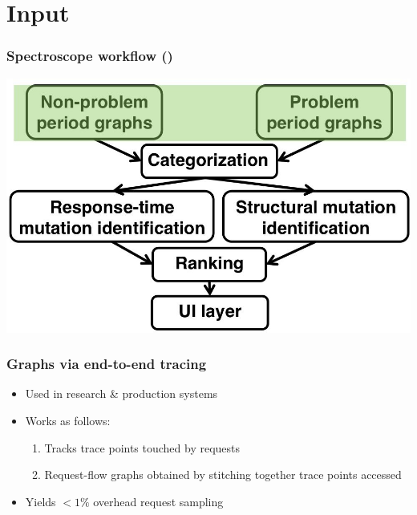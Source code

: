 \documentclass[11pt]{beamer}
\begin{document}
\section{Input}

\begin{frame}
\frametitle{Spectroscope workflow ()}
\includegraphics[width=\textwidth]{res/work1.jpg}
\end{frame}

\begin{frame}
\frametitle{Graphs via end-to-end tracing}
\begin{itemize}
  \item Used in research \& production systems
  \item Works as follows:
  \begin{enumerate}
    \item Tracks trace points touched by requests
    \item Request-flow graphs obtained by stitching together trace points accessed
  \end{enumerate}
  \item Yields $<1\%$ overhead request sampling
\end{itemize}
\end{frame}
\end{document}
